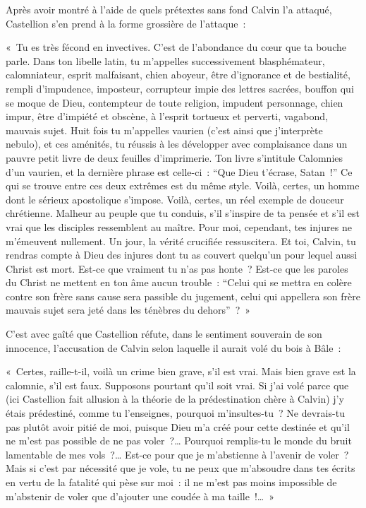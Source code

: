 \documentclass[french,twoside]{book} %
\newenvironment{quoteblock}%
  {\begin{quoting}}
  {\end{quoting}}
\newenvironment{quotebar}{%
    \def\FrameCommand{{\color{rubric!10!}\vrule width 0.5em} \hspace{0.9em}}%
    \def\OuterFrameSep{2pt} %
    \MakeFramed {\advance\hsize-\width \FrameRestore}
  }%
  {%
    \endMakeFramed
  }
\renewenvironment{quoteblock}%
  {%
    \savenotes
    \setstretch{0.9}
    \normalfont
    \begin{quotebar}
  }
  {%
    \end{quotebar}
    \spewnotes
  }
\begin{document}
\noindent Après avoir montré à l’aide de quels prétextes sans fond Calvin l’a attaqué, Castellion s’en prend à la forme grossière de l’attaque :\par

\begin{quoteblock}
\noindent « Tu es très fécond en invectives. C’est de l’abondance du cœur que ta bouche parle. Dans ton libelle latin, tu m’appelles successivement blasphémateur, calomniateur, esprit malfaisant, chien aboyeur, être d’ignorance et de bestialité, rempli d’impudence, imposteur, corrupteur impie des lettres sacrées, bouffon qui se moque de Dieu, contempteur de toute religion, impudent personnage, chien impur, être d’impiété et obscène, à l’esprit tortueux et perverti, vagabond, mauvais sujet. Huit fois tu m’appelles vaurien (c’est ainsi que j’interprète nebulo), et ces aménités, tu réussis à les développer avec complaisance dans un pauvre petit livre de deux feuilles d’imprimerie. Ton livre s’intitule Calomnies d’un vaurien, et la dernière phrase est celle-ci : “Que Dieu t’écrase, Satan !” Ce qui se trouve entre ces deux extrêmes est du même style. Voilà, certes, un homme dont le sérieux apostolique s’impose. Voilà, certes, un réel exemple de douceur chrétienne. Malheur au peuple que tu conduis, s’il s’inspire de ta pensée et s’il est vrai que les disciples ressemblent au maître. Pour moi, cependant, tes injures ne m’émeuvent nullement. Un jour, la vérité crucifiée ressuscitera. Et toi, Calvin, tu rendras compte à Dieu des injures dont tu as couvert quelqu’un pour lequel aussi Christ est mort. Est-ce que vraiment tu n’as pas honte ? Est-ce que les paroles du Christ ne mettent en ton âme aucun trouble : “Celui qui se mettra en colère contre son frère sans cause sera passible du jugement, celui qui appellera son frère mauvais sujet sera jeté dans les ténèbres du dehors” ? »\end{quoteblock}

\noindent C’est avec gaîté que Castellion réfute, dans le sentiment souverain de son innocence, l’accusation de Calvin selon laquelle il aurait volé du bois à Bâle :\par

\begin{quoteblock}
\noindent « Certes, raille-t-il, voilà un crime bien grave, s’il est vrai. Mais bien grave est la calomnie, s’il est faux. Supposons pourtant qu’il soit vrai. Si j’ai volé parce que (ici Castellion fait allusion à la théorie de la prédestination chère à Calvin) j’y étais prédestiné, comme tu l’enseignes, pourquoi m’insultes-tu ? Ne devrais-tu pas plutôt avoir pitié de moi, puisque Dieu m’a créé pour cette destinée et qu’il ne m’est pas possible de ne pas voler ?… Pourquoi remplis-tu le monde du bruit lamentable de mes vols ?… Est-ce pour que je m’abstienne à l’avenir de voler ? Mais si c’est par nécessité que je vole, tu ne peux que m’absoudre dans tes écrits en vertu de la fatalité qui pèse sur moi : il ne m’est pas moins impossible de m’abstenir de voler que d’ajouter une coudée à ma taille !… »\end{quoteblock}
\end{document}
